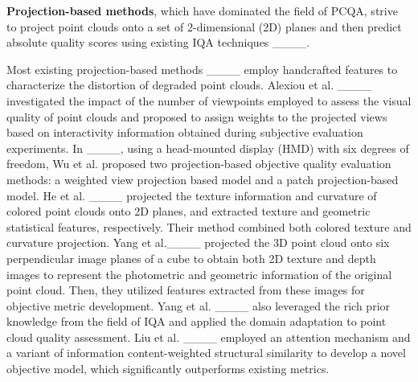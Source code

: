 \textbf{Projection-based methods}, which have dominated the field of PCQA, strive to project point clouds onto a set of 2-dimensional (2D) planes and then predict absolute quality scores using existing IQA techniques ____.

Most existing projection-based methods ____ employ handcrafted features to characterize the distortion of degraded point clouds.
Alexiou et al. ____ investigated the impact of the number of viewpoints employed to assess the visual quality of point clouds and proposed to assign weights to the projected views based on interactivity information obtained during subjective evaluation experiments.
In ____, using a head-mounted display (HMD) with six degrees of freedom, Wu et al. proposed two projection-based objective quality evaluation methods: a weighted view projection based model and a patch projection-based model. 
He et al. ____ projected the texture information and curvature of colored point clouds onto 2D planes, and extracted texture and geometric statistical features, respectively.
Their method combined both colored texture and curvature projection.
Yang et al.____ projected the 3D point cloud onto six perpendicular image planes of a cube to obtain both 2D texture and depth images to represent the photometric and geometric information of the original point cloud.
Then, they utilized features extracted from these images for objective metric development.
Yang et al. ____ also leveraged the rich prior knowledge from the field of IQA and applied the domain adaptation to point cloud quality assessment.
Liu et al. ____ employed an attention mechanism and a variant of information content-weighted structural similarity to develop a novel objective model, which significantly outperforms existing metrics. 

